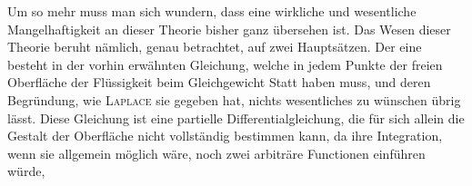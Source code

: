 \documentclass[11pt,a4paper]{article}
\begin{document}
Um so mehr muss man sich wundern, dass eine wirkliche und wesentliche Mangelhaftigkeit an dieser Theorie bisher ganz übersehen ist. Das Wesen dieser Theorie beruht nämlich, genau betrachtet, auf zwei Hauptsätzen. Der eine besteht in der vorhin erwähnten Gleichung, welche in jedem Punkte der freien Oberfläche der Flüssigkeit beim Gleichgewicht Statt haben muss, und deren Begründung, wie \textsc{Laplace} sie gegeben hat, nichts wesentliches zu wünschen übrig lässt. Diese Gleichung ist eine partielle Differentialgleichung, die für sich allein die Gestalt der Oberfläche nicht vollständig bestimmen kann, da ihre Integration, wenn sie allgemein möglich wäre, noch zwei arbiträre Functionen einführen würde,
\end{document}
